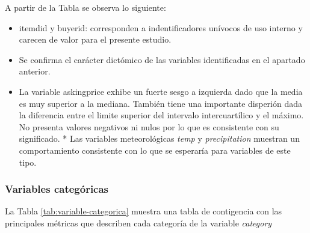 \documentclass[
  12pt]{article}
\providecommand{\tightlist}{%
  \setlength{\itemsep}{0pt}\setlength{\parskip}{0pt}}
\begin{document}
A partir de la Tabla se observa lo siguiente:

\begin{itemize}
\tightlist
\item
  itemdid y buyerid: corresponden a indentificadores unívocos de uso interno y carecen de valor para el presente estudio.
\item
  Se confirma el carácter dictómico de las variables identificadas en el apartado anterior.
\item
  La variable askingprice exhibe un fuerte sesgo a izquierda dado que la media es muy superior a la mediana. También tiene una importante disperión dada la diferencia entre el limite superior del intervalo intercuartílico y el máximo. No presenta valores negativos ni nulos por lo que es consistente con su significado. * Las variables meteorológicas \emph{temp} y \emph{precipitation} muestran un comportamiento consistente con lo que se esperaría para variables de este tipo.
\end{itemize}

\hypertarget{variables-categuxf3ricas}{%
\subsubsection{Variables categóricas}\label{variables-categuxf3ricas}}

La Tabla \ref{tab:variable-categorica} muestra una tabla de contigencia con las principales métricas que describen cada categoría de la variable \emph{category}

\begin{table}[H]

\caption{\label{tab:variable-categorica}Diagnóstico variables categóricas}
\centering
{}
\end{table}
\end{document}
